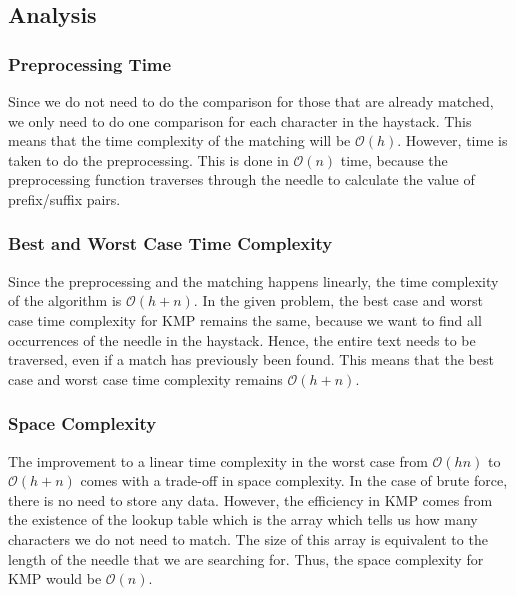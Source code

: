 \subsection*{Analysis}

\subsubsection{Preprocessing Time}
Since we do not need to do the comparison for those that are already matched, we only need to do one comparison for each character in the haystack. This means that the time complexity of the matching will be $\mathcal{O}(h)$. However, time is taken to do the preprocessing. This is done in $\mathcal{O}(n)$ time, because the preprocessing function traverses through the needle to calculate the value of prefix/suffix pairs. 

\subsubsection{Best and Worst Case Time Complexity}
Since the preprocessing and the matching happens linearly, the time complexity of the algorithm is $\mathcal{O}(h+n)$. In the given problem, the best case and worst case time complexity for KMP remains the same, because we want to find all occurrences of the needle in the haystack. Hence, the entire text needs to be traversed, even if a match has previously been found. This means that the best case and worst case time complexity remains $\mathcal{O}(h+n)$.

\subsubsection{Space Complexity}
The improvement to a linear time complexity in the worst case from $\mathcal{O}(hn)$ to $\mathcal{O}(h + n)$ comes with a trade-off in space complexity. In the case of brute force, there is no need to store any data. However, the efficiency in KMP comes from the existence of the lookup table which is the array which tells us how many characters we do not need to match. The size of this array is equivalent to the length of the needle that we are searching for. Thus, the space complexity for KMP would be $\mathcal{O}(n)$.

